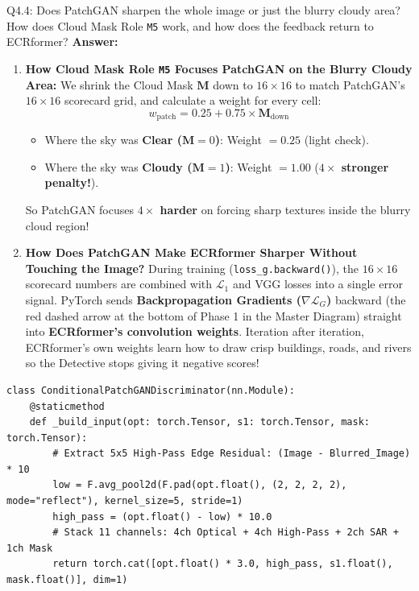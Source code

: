 \documentclass[11pt,a4paper]{article}
\begin{document}
\begin{qbox}{Q4.4: Does PatchGAN sharpen the whole image or just the blurry cloudy area? How does Cloud Mask Role \texttt{M5} work, and how does the feedback return to ECRformer?}
\textbf{Answer:}
\begin{enumerate}[leftmargin=18pt]
    \item \textbf{How Cloud Mask Role \texttt{M5} Focuses PatchGAN on the Blurry Cloudy Area:}
    We shrink the Cloud Mask $\mathbf{M}$ down to $16\times 16$ to match PatchGAN's $16\times 16$ scorecard grid, and calculate a weight for every cell:
    $$w_{\text{patch}} = 0.25 + 0.75 \times \mathbf{M}_{\text{down}}$$
    \begin{itemize}
        \item Where the sky was \textbf{Clear ($\mathbf{M}=0$)}: Weight $= \mathbf{0.25}$ (light check).
        \item Where the sky was \textbf{Cloudy ($\mathbf{M}=1$)}: Weight $= \mathbf{1.00}$ (\textbf{$4\times$ stronger penalty!}).
    \end{itemize}
    So PatchGAN focuses \textbf{$4\times$ harder} on forcing sharp textures inside the blurry cloud region!

    \item \textbf{How Does PatchGAN Make ECRformer Sharper Without Touching the Image?}
    During training (\texttt{loss\_g.backward()}), the $16\times 16$ scorecard numbers are combined with $\mathcal{L}_1$ and VGG losses into a single error signal. PyTorch sends \textbf{Backpropagation Gradients ($\nabla \mathcal{L}_G$)} backward (the red dashed arrow at the bottom of Phase 1 in the Master Diagram) straight into \textbf{ECRformer's convolution weights}.
    Iteration after iteration, ECRformer's own weights learn how to draw crisp buildings, roads, and rivers so the Detective stops giving it negative scores!
\end{enumerate}

\begin{lstlisting}[caption={Conditional PatchGAN \& Cloud-Mask Weighted Loss Role M5 (from \texttt{backend/losses/patchgan\_loss.py})}]
class ConditionalPatchGANDiscriminator(nn.Module):
    @staticmethod
    def _build_input(opt: torch.Tensor, s1: torch.Tensor, mask: torch.Tensor):
        # Extract 5x5 High-Pass Edge Residual: (Image - Blurred_Image) * 10
        low = F.avg_pool2d(F.pad(opt.float(), (2, 2, 2, 2), mode="reflect"), kernel_size=5, stride=1)
        high_pass = (opt.float() - low) * 10.0
        # Stack 11 channels: 4ch Optical + 4ch High-Pass + 2ch SAR + 1ch Mask
        return torch.cat([opt.float() * 3.0, high_pass, s1.float(), mask.float()], dim=1)


\end{lstlisting}
\end{qbox}
\end{document}
